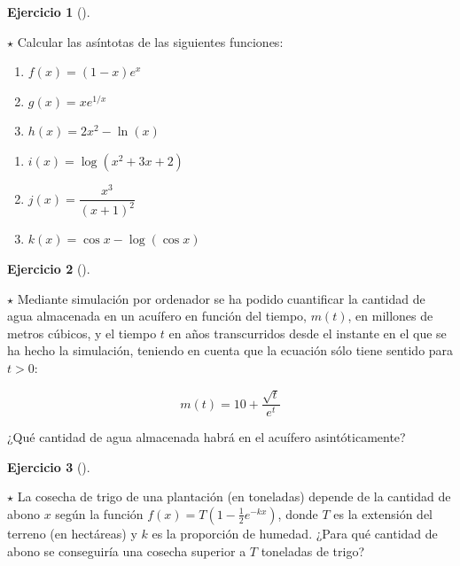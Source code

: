 \documentclass[
  a4paper,
]{scrreport}
\theoremstyle{definition}
\newtheorem{exercise}{Ejercicio}[chapter]
\theoremstyle{remark}
\begin{document}
\leavevmode{}%
\begin{exercise}[]\label{exr-asintotas}

\(\star\) Calcular las asíntotas de las siguientes funciones:

\begin{enumerate}
\def\labelenumi{\alph{enumi}.}
\item
  \(f(x)=(1-x)e^x\)
\item
  \(g(x)=xe^{1/x}\)
\item
  \(h(x)=2x^2-\ln(x)\)
\end{enumerate}

\begin{enumerate}
\def\labelenumi{\alph{enumi}.}
\setcounter{enumi}{3}
\item
  \(i(x)=\log(x^2+3x+2)\)
\item
  \(j(x)=\dfrac{x^3}{(x+1)^2}\)
\item
  \(k(x)=\cos x-\log(\cos x)\)
\end{enumerate}

\end{exercise}

\leavevmode{}%
\begin{exercise}[]\label{exr-acuifero}

\(\star\) Mediante simulación por ordenador se ha podido cuantificar la
cantidad de agua almacenada en un acuífero en función del tiempo,
\(m(t)\), en millones de metros cúbicos, y el tiempo \(t\) en años
transcurridos desde el instante en el que se ha hecho la simulación,
teniendo en cuenta que la ecuación sólo tiene sentido para \(t>0\):

\[
m(t) = 10 + \frac{\sqrt{t}}{e^t}
\]

¿Qué cantidad de agua almacenada habrá en el acuífero asintóticamente?

\end{exercise}

\leavevmode{}%
\begin{exercise}[]\label{exr-cosecha}

\(\star\) La cosecha de trigo de una plantación (en toneladas) depende
de la cantidad de abono \(x\) según la función
\(f(x)=T(1-\frac{1}{2}e^{-kx})\), donde \(T\) es la extensión del
terreno (en hectáreas) y \(k\) es la proporción de humedad. ¿Para qué
cantidad de abono se conseguiría una cosecha superior a \(T\) toneladas
de trigo?

\end{exercise}
\end{document}
